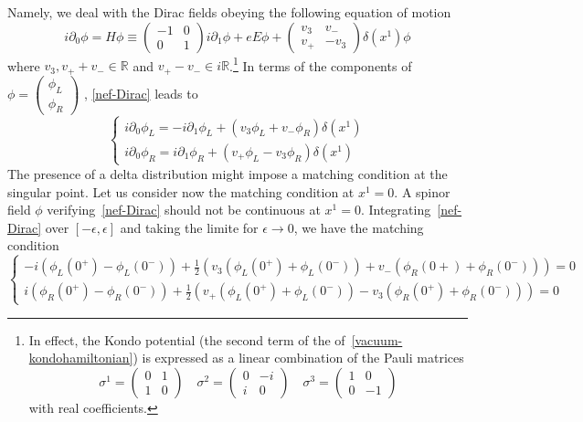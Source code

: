 Namely, we deal with the Dirac fields obeying the following equation of motion
\begin{equation}\label{nef-Dirac}
i \partial_0 \phi = H\phi \equiv
\begin{pmatrix} 
-1 & 0 \\
0 & 1 
\end{pmatrix} i \partial_1 \phi 
+ eE\phi
+
\begin{pmatrix}
v_3 & v_- \\
v_+ & -v_3
\end{pmatrix} \delta(x^1) \phi
\end{equation}
where $v_3, v_+ + v_- \in \mathbb{R}$ and $ v_+ - v_-\in i \mathbb{R}$.\footnote{
In effect, the Kondo potential (the second term of the \rhs of~\cref{vacuum-kondohamiltonian}) is expressed as a linear combination of the Pauli matrices
\begin{equation*}
\sigma^1 = \begin{pmatrix} 0 & 1 \\ 1 & 0 \end{pmatrix} \quad
\sigma^2 = \begin{pmatrix} 0 & -i \\ i & 0 \end{pmatrix} \quad
\sigma^3 = \begin{pmatrix} 1 & 0 \\ 0 & -1 \end{pmatrix} 
\end{equation*}
with real coefficients.
}
In terms of the components of $\phi =
\begin{pmatrix}
\phi_L \\
\phi_R
\end{pmatrix}$
, \cref{nef-Dirac} leads to
\begin{equation}
\begin{cases}
i \partial_0 \phi_L = -i\partial_1 \phi_L + (v_3 \phi_L + v_- \phi_R) \delta(x^1) \\
i \partial_0 \phi_R = i\partial_1 \phi_R + (v_+ \phi_L - v_3 \phi_R) \delta(x^1)
\end{cases}
\end{equation}
The presence of a delta distribution might impose a matching condition at the singular point.
Let us consider now the matching condition at $x^1=0$.
A spinor field $\phi$ verifying~\cref{nef-Dirac} should not be continuous at $x^1 = 0$. 
Integrating~\cref{nef-Dirac} over $[-\epsilon, \epsilon]$ and taking the limite for $\epsilon \rightarrow 0$,
we have the matching condition
\begin{equation}\label{nef-matching}
\begin{cases}
-i(\phi_L(0^+) - \phi_L(0^-)) + \frac{1}{2}(v_3 (\phi_L(0^+) + \phi_L(0^-))+ v_- (\phi_R(0+) + \phi_R(0^-))) = 0 \\
i(\phi_R(0^+) - \phi_R(0^-)) + \frac{1}{2}(v_+ (\phi_L(0^+) + \phi_L(0^-)) - v_3 (\phi_R(0^+) + \phi_R(0^-))) = 0
\end{cases}
\end{equation}
